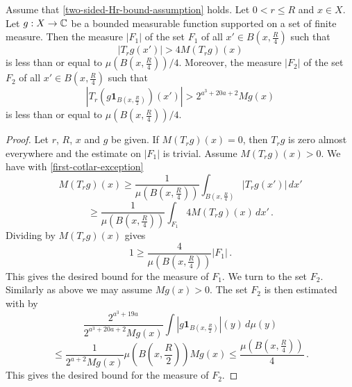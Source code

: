 \begin{lemma}
\label{Cotlar-sets}
Assume that \eqref{two-sided-Hr-bound-assumption} holds. Let $0<r\le R$ and  $x\in X$. Let $g:X\to{\mathbb{C}}$ be a bounded measurable function supported on a set of finite measure.
Then the measure $|F_1|$ of the set $F_1$ of all $x'\in B(x,\frac {R} 4)$ such that
\begin{equation}
\label{first-cotlar-exception}
    |T_rg(x')|> 4 M(T_rg)(x)
\end{equation}
is less than or equal to $\mu(B(x,\frac{R}{4}))/4$.
Moreover,  the measure $|F_2|$ of the set $F_2$ of all $x'\in
B(x,\frac {R} 4)$ such that
\begin{equation}
\label{second-cotlar-exception}
    |T_r(g\mathbf{1}_{B(x,\frac {R} 2)})(x')| > 2^{a^3 + 20a + 2} Mg(x)
\end{equation}
is less than or equal to  $\mu(B(x,\frac{R}{4}))/4$.
\end{lemma}

\begin{proof}
Let $r$, $R$, $x$ and $g$ be given.
If $M(T_rg)(x)=0$, then $T_rg$ is zero almost everywhere and the estimate on $|F_1|$ is trivial.
Assume $M(T_rg)(x)>0$.
We have with \eqref{first-cotlar-exception}
\begin{equation}
    M(T_rg)(x)\ge
    \frac 1{\mu(B(x,\frac{R}{4}))}\int_{B(x,\frac{R}{4})}|T_rg(x')|\, dx'
\end{equation}
\begin{equation}
    \ge
    \frac 1{\mu(B(x,\frac{R}{4}))}\int_{F_1} 4 M(T_rg)(x)\, dx' \,.
\end{equation}
Dividing by $M(T_rg)(x)$ gives
\begin{equation}
    1\ge \frac{4}{\mu(B(x,\frac{R}{4}))} |F_1|\, .
\end{equation}
This gives the desired bound for the measure of $F_1$.
We turn to the set $F_2$. Similarly as above we may assume $Mg(x)>0$.
The set $F_2$ is then estimated with  by
\begin{equation}
   \frac {2^{a^3+19a}}{2^{a^3 + 20a + 2}Mg(x)}\int |g\mathbf{1}_{B(x,\frac {R}2)}|(y)\, d\mu(y)
\end{equation}
\begin{equation}
   \le \frac {1}{2^{a+2} Mg(x)}\mu(B(x,\frac {R}{2})) Mg(x) \le \frac{\mu(B(x,\frac {R}{4}))}{4} \,.
\end{equation}
This gives the desired bound for the measure of $F_2$.
\end{proof}

